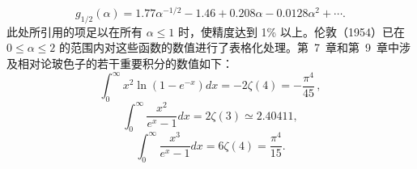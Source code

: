 \begin{equation}\tag{17.4.20}\label{eq:17.4.20}
g _ { 1 / 2 } ( \alpha ) = 1 . 77 \alpha ^{- 1 / 2} - 1 . 46 + 0 . 20 8 \alpha - 0 . 01 28 \alpha ^{2} + \cdots .
\end{equation}
此处所引用的项足以在所有 \(\alpha \leq 1\) 时，使精度达到 1\% 以上。伦敦（1954）已在 \(0 \leq \alpha \leq 2\) 的范围内对这些函数的数值进行了表格化处理。第~7~章和第~9~章中涉及相对论玻色子的若干重要积分的数值如下：
\begin{equation}\tag{17.4.21}\label{eq:17.4.21}
\int _ { 0 } ^{\infty} x ^{2} \ln ( 1 - e ^{- x} ) d x = - 2 \zeta ( 4 ) = - \frac { \pi ^{4} } { 45 } \, ,
\end{equation}
\begin{equation}\tag{17.4.22}\label{eq:17.4.22}
\int _ { 0 } ^{\infty} \frac { x ^{2} } { e ^{x} - 1 } d x = 2 \zeta ( 3 ) \simeq 2 . 40 41 1 ,
\end{equation}
\begin{equation}\tag{17.4.23}\label{eq:17.4.23}
\int _ { 0 } ^{\infty} \frac { x ^{3} } { e ^{x} - 1 } d x = 6 \zeta ( 4 ) = \frac { \pi ^{4} } { 15 } .
\end{equation}
